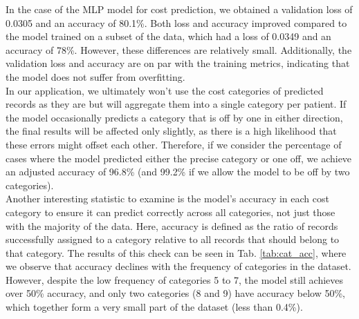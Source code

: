 In the case of the MLP model for cost prediction, we obtained a validation loss of 0.0305 and an accuracy of 80.1\%. Both loss and accuracy improved compared to the model trained on a subset of the data, which had a loss of 0.0349 and an accuracy of 78\%. However, these differences are relatively small. Additionally, the validation loss and accuracy are on par with the training metrics, indicating that the model does not suffer from overfitting.
\\

In our application, we ultimately won't use the cost categories of predicted records as they are but will aggregate them into a single category per patient. If the model occasionally predicts a category that is off by one in either direction, the final results will be affected only slightly, as there is a high likelihood that these errors might offset each other. Therefore, if we consider the percentage of cases where the model predicted either the precise category or one off, we achieve an adjusted accuracy of 96.8\% (and 99.2\% if we allow the model to be off by two categories). 
\\

Another interesting statistic to examine is the model's accuracy in each cost category to ensure it can predict correctly across all categories, not just those with the majority of the data. Here, accuracy is defined as the ratio of records successfully assigned to a category relative to all records that should belong to that category.  The results of this check can be seen in Tab. \ref{tab:cat_acc}, where we observe that accuracy declines with the frequency of categories in the dataset. However, despite the low frequency of categories 5 to 7, the model still achieves over 50\% accuracy, and only two categories (8 and 9) have accuracy below 50\%, which together form a very small part of the dataset (less than 0.4\%).
\\

